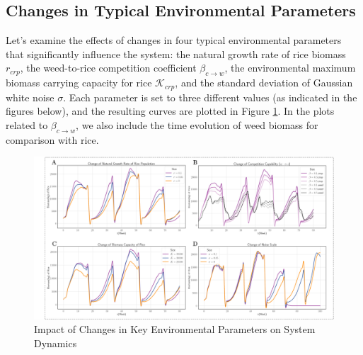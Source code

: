 \documentclass{HZNUMCM}
\begin{document}
    \subsection{Changes in Typical Environmental Parameters}
      Let's examine the effects of changes in four typical environmental parameters that significantly influence the system: 
      the natural growth rate of rice biomass \( r_{crp} \), 
      the weed-to-rice competition coefficient \( \beta_{c\rightarrow w} \), 
      the environmental maximum biomass carrying capacity for rice \( \mathscr{K}_{crp} \), 
      and the standard deviation of Gaussian white noise \( \sigma \). 
      Each parameter is set to three different values (as indicated in the figures below), 
      and the resulting curves are plotted in Figure \ref{fig:Change_all}. 
      In the plots related to \( \beta_{c\rightarrow w} \), 
      we also include the time evolution of weed biomass for comparison with rice.

    \begin{figure}[H]
      \includegraphics[width=\linewidth]{images/Change_all.png}
      \caption{Impact of Changes in Key Environmental Parameters on System Dynamics}
      \label{fig:Change_all}
    \end{figure}
\end{document}
